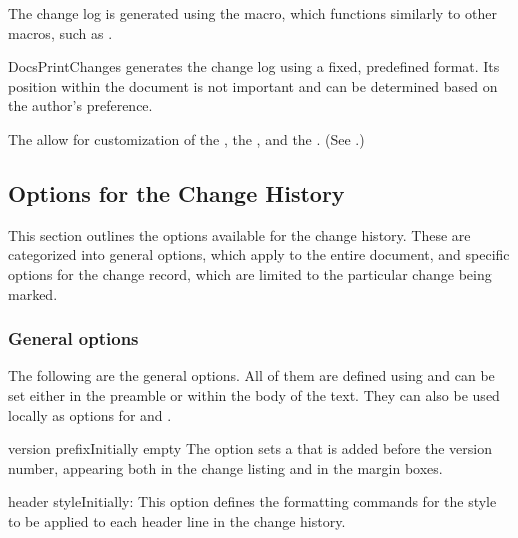 \documentclass[11pt, outdir = ./out]{article}
\begin{document}
The change log is generated using the  macro, which functions similarly to other macros, such as .

\begin{Macrodef}{DocsPrintChanges}{}{}
     generates the change log using a fixed, predefined format. Its position within the document is not important and can be determined based on the author's preference.

    The  allow for customization of the , the , and the . (See .)
\end{Macrodef}

\begin{DocsListing}
    \DocsPrintChanges[version prefix = {V}]
\end{DocsListing}

\subsection{Options for the Change History}\label{sec:options-change-history}

This section outlines the options available for the change history. These are categorized into general options, which apply to the entire document, and specific options for the change record, which are limited to the particular change being marked.

\subsubsection{General options}

The following are the general options. All of them are defined using  and can be set either in the preamble or within the body of the text. They can also be used locally as options for  and .

\begin{Optiondef}{version prefix}{}{Initially empty}
    The  option sets a  that is added before the version number, appearing both in the change listing and in the margin boxes.
\end{Optiondef}

\begin{Optiondef}{header style}{}{Initially: }
    This option defines the formatting commands for the style to be applied to each header line in the change history.
\end{Optiondef}
\end{document}
